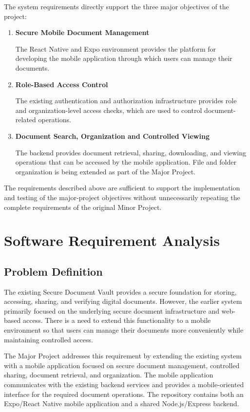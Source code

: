 \documentclass[12pt]{article}
\begin{document}
The system requirements directly support the three major objectives of the project:

\begin{enumerate}

    \item \textbf{Secure Mobile Document Management}

    The React Native and Expo environment provides the platform for developing the mobile application through which users can manage their documents.

    \item \textbf{Role-Based Access Control}

    The existing authentication and authorization infrastructure provides role and organization-level access checks, which are used to control document-related operations.

    \item \textbf{Document Search, Organization and Controlled Viewing}

    The backend provides document retrieval, sharing, downloading, and viewing operations that can be accessed by the mobile application. File and folder organization is being extended as part of the Major Project.

\end{enumerate}
The requirements described above are sufficient to support the implementation and testing of the major-project objectives without unnecessarily repeating the complete requirements of the original Minor Project.

\newpage

\section{Software Requirement Analysis}

\subsection{Problem Definition}

The existing Secure Document Vault provides a secure foundation for storing, accessing, sharing, and verifying digital documents. However, the earlier system primarily focused on the underlying secure document infrastructure and web-based access. There is a need to extend this functionality to a mobile environment so that users can manage their documents more conveniently while maintaining controlled access.

The Major Project addresses this requirement by extending the existing system with a mobile application focused on secure document management, controlled sharing, document retrieval, and organization. The mobile application communicates with the existing backend services and provides a mobile-oriented interface for the required document operations. The repository contains both an Expo/React Native mobile application and a shared Node.js/Express backend.
\end{document}
